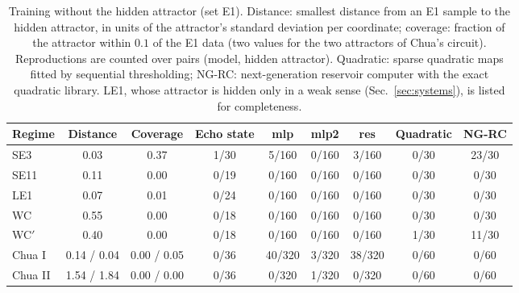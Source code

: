 \begin{table}
\caption{Training without the hidden attractor (set E1). Distance: smallest distance from an E1 sample to the hidden
attractor, in units of the attractor's standard deviation per coordinate; coverage: fraction of the attractor within $0.1$
of the E1 data (two values for the two attractors of Chua's circuit). Reproductions are counted over pairs (model, hidden
attractor). Quadratic: sparse quadratic maps fitted by sequential thresholding; NG-RC: next-generation reservoir computer
with the exact quadratic library. LE1, whose attractor is hidden only in a weak sense (Sec.~\ref{sec:systems}), is listed
for completeness.}
\label{tab:e1}
\begin{ruledtabular}
\begin{tabular}{lcccccccc}
Regime & Distance & Coverage & Echo state & mlp & mlp2 & res & Quadratic & NG-RC \\
\hline
SE3 & 0.03 & 0.37 & 1/30 & 5/160 & 0/160 & 3/160 & 0/30 & 23/30 \\
SE11 & 0.11 & 0.00 & 0/19 & 0/160 & 0/160 & 0/160 & 0/30 & 0/30 \\
LE1 & 0.07 & 0.01 & 0/24 & 0/160 & 0/160 & 0/160 & 0/30 & 0/30 \\
WC & 0.55 & 0.00 & 0/18 & 0/160 & 0/160 & 0/160 & 0/30 & 0/30 \\
WC$'$ & 0.40 & 0.00 & 0/18 & 0/160 & 0/160 & 0/160 & 1/30 & 11/30 \\
Chua I & 0.14 / 0.04 & 0.00 / 0.05 & 0/36 & 40/320 & 3/320 & 38/320 & 0/60 & 0/60 \\
Chua II & 1.54 / 1.84 & 0.00 / 0.00 & 0/36 & 0/320 & 1/320 & 0/320 & 0/60 & 0/60 \\
\end{tabular}
\end{ruledtabular}
\end{table}
